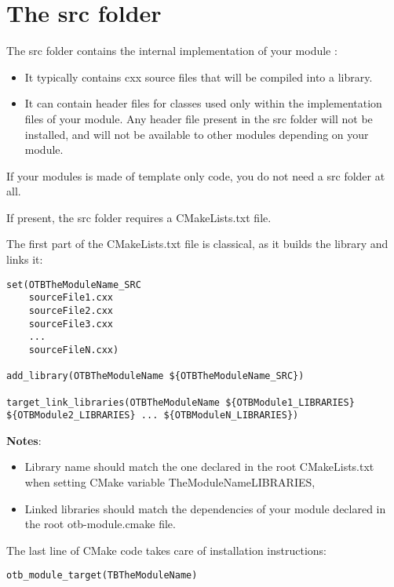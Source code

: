 \section{The src folder }

The src folder contains the internal implementation of your module : 

\begin{itemize}
       \item  It typically contains cxx source files that will be compiled into a library.  
       \item  It can contain header files for classes used only within the implementation files of your module. Any header file present in the src folder will not be installed, and will not be available to other modules depending on your module.
\end{itemize}

If your modules is made of template only code, you do not need a src folder at all.

If present, the src folder requires a CMakeLists.txt file.

The first part of the CMakeLists.txt file is classical, as it builds the library and links it: 

\begin{verbatim}
set(OTBTheModuleName_SRC
    sourceFile1.cxx
    sourceFile2.cxx
    sourceFile3.cxx
    ...
    sourceFileN.cxx)

add_library(OTBTheModuleName ${OTBTheModuleName_SRC})

target_link_libraries(OTBTheModuleName ${OTBModule1_LIBRARIES} ${OTBModule2_LIBRARIES} ... ${OTBModuleN_LIBRARIES})
\end{verbatim}

\textbf{Notes}: 

\begin{itemize}
       \item  Library name should match the one declared in the root CMakeLists.txt when setting CMake variable TheModuleName\textunderscore LIBRARIES,   
       \item  Linked libraries should match the dependencies of your module declared in the root otb-module.cmake file. 
\end{itemize}

The last line of CMake code takes care of installation instructions: 
\begin{verbatim}
otb_module_target(TBTheModuleName)
\end{verbatim}

